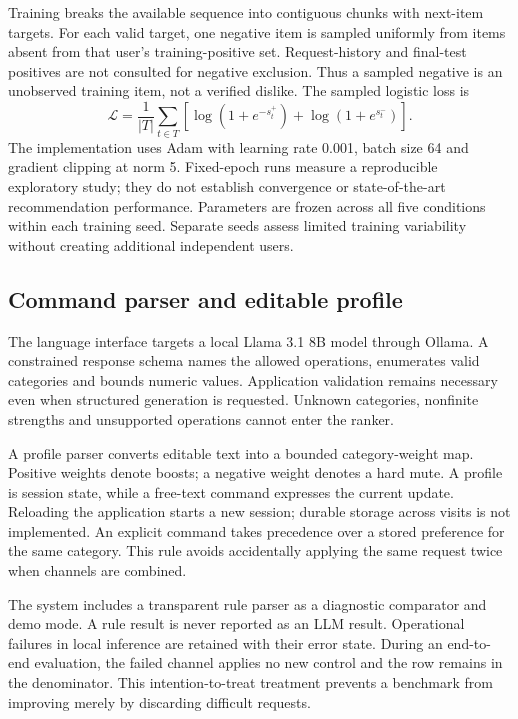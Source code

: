 \documentclass[conference]{IEEEtran}
\begin{document}
Training breaks the available sequence into contiguous chunks with next-item targets. For each valid target, one negative item is sampled uniformly from items absent from that user's training-positive set. Request-history and final-test positives are not consulted for negative exclusion. Thus a sampled negative is an unobserved training item, not a verified dislike. The sampled logistic loss is
\begin{equation}
\mathcal L = \frac{1}{|T|}\sum_{t\in T}\left[\log(1+e^{-s_t^+})+\log(1+e^{s_t^-})\right].
\end{equation}
The implementation uses Adam with learning rate 0.001, batch size 64 and gradient clipping at norm 5. Fixed-epoch runs measure a reproducible exploratory study; they do not establish convergence or state-of-the-art recommendation performance. Parameters are frozen across all five conditions within each training seed. Separate seeds assess limited training variability without creating additional independent users.

\subsection{Command parser and editable profile}
The language interface targets a local Llama 3.1 8B model through Ollama. A constrained response schema names the allowed operations, enumerates valid categories and bounds numeric values. Application validation remains necessary even when structured generation is requested. Unknown categories, nonfinite strengths and unsupported operations cannot enter the ranker.

A profile parser converts editable text into a bounded category-weight map. Positive weights denote boosts; a negative weight denotes a hard mute. A profile is session state, while a free-text command expresses the current update. Reloading the application starts a new session; durable storage across visits is not implemented. An explicit command takes precedence over a stored preference for the same category. This rule avoids accidentally applying the same request twice when channels are combined.

The system includes a transparent rule parser as a diagnostic comparator and demo mode. A rule result is never reported as an LLM result. Operational failures in local inference are retained with their error state. During an end-to-end evaluation, the failed channel applies no new control and the row remains in the denominator. This intention-to-treat treatment prevents a benchmark from improving merely by discarding difficult requests.
\end{document}
